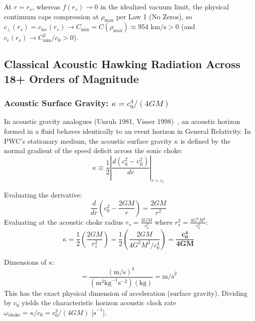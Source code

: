 \documentclass[11pt,a4paper]{article}
\begin{document}
At $r = r_s$, whereas $f(r_s) \to 0$ in the idealized vacuum limit, the physical continuum caps compression at $\rho_{\max}$ per Law 1 (No Zeros), so $c_\perp(r_s) = c_{\text{loc}}(r_s) \to C_{\min} = C(\rho_{\max}) \approx 954\text{ km/s} > 0$ (and $c_r(r_s) \to C_{\min}^2 / c_0 > 0$).

\subsection{Classical Acoustic Hawking Radiation Across 18+ Orders of Magnitude}
\label{subsec:acoustic_hawking}

\subsubsection{Acoustic Surface Gravity: $\kappa = c_0^4 / (4GM)$}
\label{subsubsec:kappa_derivation}

In acoustic gravity analogues (Unruh 1981, Visser 1998)~\cite{Unruh1981,Visser1998}, an acoustic horizon formed in a fluid behaves identically to an event horizon in General Relativity. In PWC's stationary medium, the acoustic surface gravity $\kappa$ is defined by the normal gradient of the speed deficit across the sonic choke:
\begin{equation}
\kappa \equiv \frac{1}{2} \left| \frac{d(c_0^2 - v_{\text{ff}}^2)}{dr} \right|_{r = r_s}
\label{eq:kappa_gradient_def}
\end{equation}

Evaluating the derivative:
\begin{equation}
\frac{d}{dr} \left( c_0^2 - \frac{2GM}{r} \right) = \frac{2GM}{r^2}
\end{equation}
Evaluating at the acoustic choke radius $r_s = \frac{2GM}{c_0^2}$ where $r_s^2 = \frac{4 G^2 M^2}{c_0^4}$:
\begin{equation}
\kappa = \frac{1}{2} \left( \frac{2GM}{r_s^2} \right) = \frac{1}{2} \left( \frac{2GM}{4 G^2 M^2 / c_0^4} \right) = \mathbf{\frac{c_0^4}{4GM}}
\label{eq:kappa_exact_val}
\end{equation}

Dimensions of $\kappa$:
\begin{equation}
[\kappa] = \frac{(\text{m/s})^4}{(\text{m}^3\text{kg}^{-1}\text{s}^{-2})(\text{kg})} = \text{m/s}^2
\end{equation}
This has the exact physical dimension of acceleration (surface gravity). Dividing by $c_0$ yields the characteristic horizon acoustic clock rate $\omega_{\text{choke}} = \kappa/c_0 = c_0^3 / (4GM)\text{ [s}^{-1}\text{]}$.
\end{document}
